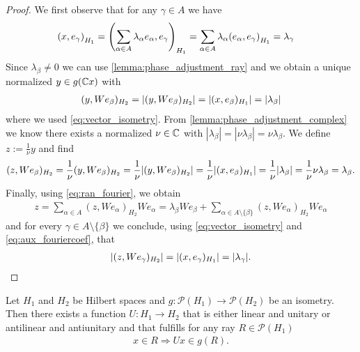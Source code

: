 \begin{proof}
	We first observe that for any $\gamma \in A$ we have
	\begin{align}
		{\left ( x, e_\gamma \right )}_{H_1} &= {\left ( \sum_{\alpha \in A} \lambda_\alpha e_\alpha, e_\gamma \right )}_{H_1} = \sum_{\alpha \in A} \lambda_\alpha {\left ( e_\alpha, e_\gamma \right )}_{H_1} = \lambda_\gamma \label{eq:aux_fouriercoef}
	\end{align}
	Since $\lambda_\beta \neq 0$ we can use \ref{lemma:phase_adjustment_ray} and we obtain a unique normalized $y \in g(\mathbb{C} x)$ with 
	\begin{align*}
		(y, W e_\beta)_{H_2} = |(y, W e_\beta)_{H_2}| = |(x, e_\beta)_{H_1}| = {\left | \lambda_\beta \right |}
	\end{align*}
	where we used \eqref{eq:vector_isometry}. From \ref{lemma:phase_adjustment_complex} we know there exists a normalized $\nu \in \mathbb{C}$ with $|\lambda_\beta| = |\nu \lambda_\beta| = \nu \lambda_\beta$. We define $z := \frac{1}{\nu} y$ and find
	\begin{align*}
		(z, We_\beta)_{H_2} = \frac{1}{\nu} (y, W e_\beta)_{H_2} = \frac{1}{\nu} |(y, W e_\beta)_{H_2}| = \frac{1}{\nu} |(x, e_\beta)_{H_1}| = \frac{1}{\nu} {\left | \lambda_\beta \right |} = \frac{1}{\nu} \nu \lambda_\beta = \lambda_\beta.
	\end{align*} 
	Finally, using \eqref{eq:ran_fourier}, we obtain
	\begin{align*}
		z = \sum_{\alpha \in A} (z, We_\alpha)_{H_2} We_\alpha = \lambda_\beta W e_\beta + \sum_{\alpha \in A \setminus \{\beta\}} (z, We_\alpha)_{H_2} We_\alpha 
	\end{align*}
	and for every $\gamma \in A \setminus \{\beta\}$ we conclude, using \eqref{eq:vector_isometry} and \eqref{eq:aux_fouriercoef}, that
	\begin{align*}
		{\left | (z, We_\gamma)_{H_2} \right |} = |(x, e_\gamma)_{H_1}| = |\lambda_\gamma|.
	\end{align*}
\end{proof}

\begin{theorem}
	Let $H_1$ and $H_2$ be Hilbert spaces and $g: \mathcal{P}(H_1) \to \mathcal{P}(H_2)$ be an isometry. Then there exists a function $U: H_1 \to H_2$ that is either linear and unitary or antilinear and antiunitary and that fulfills for any ray $R \in \mathcal{P}(H_1)$
	\begin{align*}
		x \in R \Rightarrow Ux \in g(R).
	\end{align*}
\end{theorem}

